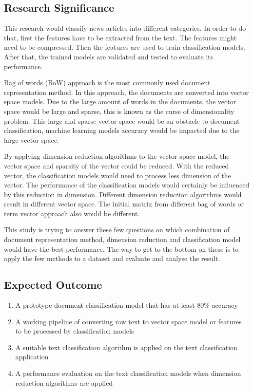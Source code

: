 \subsection{Research Significance}
This research would classify news articles into different categories. In order to do that, first the features have to be extracted from the text. The features might need to be compressed. Then the features are used to train classification models. After that, the trained models are validated and tested to evaluate its performance.

Bag of words (BoW) approach is the most commonly used document representation method. In this approach, the documents are converted into vector space models. Due to the large amount of words in the documents, the vector space would be large and sparse, this is known as the curse of dimensionality problem. This large and sparse vector space would be an obstacle to document classification, machine learning models accuracy would be impacted due to the large vector space.

By applying dimension reduction algorithms to the vector space model, the vector space and sparsity of the vector could be reduced. With the reduced vector, the classification models would need to process less dimension of the vector. The performance of the classification models would certainly be influenced by this reduction in dimension. Different dimension reduction algorithms would result in different vector space. The initial matrix from different bag of words or term vector approach also would be different.

This study is trying to answer these few questions on which combination of document representation method, dimension reduction and classification model would have the best performance. The way to get to the bottom on these is to apply the few methods to a dataset and evaluate and analyse the result.\\


\subsection{Expected Outcome}
\begin{enumerate}
	\item A prototype document classification model that has at least 80\% accuracy
	\item A working pipeline of converting raw text to vector space model or features to be processed by classification models
	\item A suitable text classification algorithm is applied on the text classification application
	\item A performance evaluation on the text classification models when dimension reduction algorithms are applied
\end{enumerate}

